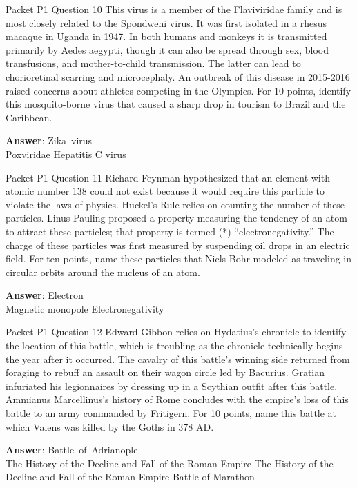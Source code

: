 \begin{frame}{Packet P1 Question 10}
This virus is a member of the Flaviviridae family and is most   closely related to the   Spondweni virus. It was first isolated in a rhesus macaque in Uganda in 1947.     In both humans and monkeys it is transmitted primarily by Aedes aegypti, though it can also be spread through sex, blood transfusions, and mother-to-child transmission. The latter can lead to chorioretinal scarring and microcephaly. An outbreak of this disease in 2015-2016 raised concerns about athletes competing in the Olympics. For 10 points, identify this mosquito-borne virus   that caused a sharp drop in tourism to Brazil and the Caribbean.

\textbf{Answer}: Zika\ virus\\
 Poxviridae
 Hepatitis C virus
\end{frame}

\begin{frame}{Packet P1 Question 11}
Richard Feynman hypothesized that an element with atomic number 138 could not exist because it would require this particle to violate the laws of physics. Huckel's Rule relies on counting   the number of these particles. Linus Pauling proposed a property measuring the tendency of an atom to attract these   particles; that property   is termed (*) ``electronegativity.'' The charge of these   particles was first measured by suspending oil drops in an   electric field. For ten points, name these particles that Niels Bohr modeled as traveling in circular orbits around the   nucleus of an atom.

\textbf{Answer}: Electron\\
 Magnetic monopole
 Electronegativity
\end{frame}

\begin{frame}{Packet P1 Question 12}
Edward Gibbon relies on     Hydatius’s chronicle to identify the location of this battle, which is troubling as the chronicle technically begins the year after it occurred. The cavalry of this battle’s winning side returned from foraging to rebuff an assault on their wagon circle led by Bacurius. Gratian     infuriated his legionnaires by dressing up in a Scythian outfit after this battle. Ammianus Marcellinus's history of Rome concludes with the empire's loss of this battle to an army commanded by Fritigern. For 10 points, name this battle at which Valens was killed by the Goths in   378 AD.  

\textbf{Answer}: Battle\ of\ Adrianople\\
 The History of the Decline and Fall of the Roman Empire
 The History of the Decline and Fall of the Roman Empire
 Battle of Marathon
\end{frame}

